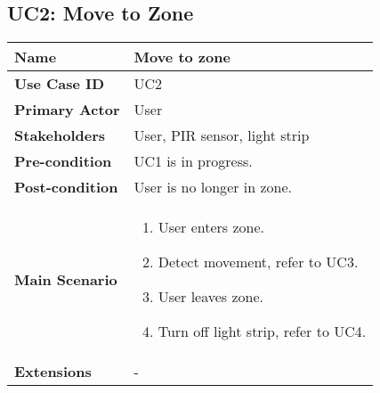 
\subsection{UC2: Move to Zone}
    \begin{tabular}{|p{}||p{}|}
        \hline
        \textbf{Name} & Move to zone \\
        \hline
        \textbf{Use Case ID} & UC2 \\
        \hline
        \textbf{Primary Actor} & User \\
        \hline
        \textbf{Stakeholders} & User, PIR sensor, light strip \\
        \hline
        \textbf{Pre-condition} & UC1 is in progress. \\
        \hline
        \textbf{Post-condition} & User is no longer in zone. \\
        \hline
        \textbf{Main Scenario} &
        \begin{enumerate}
            \item User enters zone.
            \item Detect movement, refer to UC3.
            \item User leaves zone.
            \item Turn off light strip, refer to UC4.
        \end{enumerate}
        \\
        \hline
        \textbf{Extensions} & - \\
        \hline
    \end{tabular}
    
